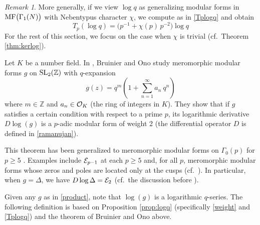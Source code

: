 \documentclass{gtpart}
\theoremstyle{definition}
\theoremstyle{remark}
\newtheorem{rmk}[thm]{Remark}
\newcommand{\mb}[1]{\mathbb{#1}}
\newcommand{\CE}{{\cal E}}
\newcommand{\CO}{{\cal O}}
\newcommand{\BZ}{{\mb Z}}
\newcommand{\MF}{{\rm MF}}
\renewcommand{\D}{\Delta}
\newcommand{\G}{\Gamma}
\renewcommand{\=}{\approx}
\renewcommand{\-}{\sim}
\newcommand{\SL}{{\rm SL}}
\numberwithin{equation}{section}
\numberwithin{thm}{section}
\begin{document}
\begin{rmk}
 \label{rmk:nebentypus}
 More generally, if we view $\log q$ as generalizing modular forms in 
 $\MF\big(\G_1(N)\big)$ with Nebentypus character $\chi$, we compute as in 
 \eqref{Tplogq} and obtain 
 \[
  T_p (\log q) = \big( p^{-1} + \chi(p) \, p^{-2} \big) \log q 
 \]
 For the rest of this section, we focus on the case when $\chi$ is trivial 
 (cf.~Theorem \ref{thm:kerlog}).  
\end{rmk}

Let $K$ be a number field.  In \cite{BruinierOno}, Bruinier and Ono study 
meromorphic modular forms $g$ on $\SL_2(\BZ)$ with $q$-expansion 
\begin{equation}
 \label{product}
 g(z) = q^m \left( 1 + \sum_{n = 1}^\infty a_n ~\! q^n \right) 
\end{equation}
where $m \in \BZ$ and $a_n \in \CO_K$ (the ring of integers in $K$).  They show 
that if $g$ satisfies a certain condition with respect to a prime $p$, its 
logarithmic derivative $D \log(g)$ is a $p$-adic modular form of weight 2 
\cite[Theorem 1]{BruinierOno} (the differential operator $D$ is defined in 
\eqref{ramanujan}).  

This theorem has been generalized to meromorphic modular forms on $\G_0(p)$ for 
$p \geq 5$ \cite[Theorem 4]{Getz}.  Examples include $\CE_{p - 1}$ at each 
$p \geq 5$ and, for all $p$, meromorphic modular forms whose zeros and poles are 
located only at the cusps (cf.~\cite[Definition 3.1]{BruinierOno}).  In 
particular, when $g = \D$, we have $D \log \D = \CE_2$ (cf.~the discussion 
before \cite[Th\'eor\`eme 5]{fmpadiq}).  

Given any $g$ as in \eqref{product}, note that $\log(g)$ is a logarithmic 
$q$-series.  The following definition is based on Proposition \ref{prop:logq} 
(specifically \eqref{weight} and \eqref{Tplogq}) and the theorem of Bruinier and 
Ono above.  
\end{document}
